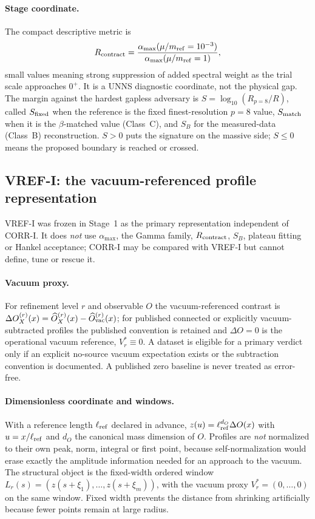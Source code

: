\documentclass[11pt,a4paper]{article}
\theoremstyle{definition}
\theoremstyle{remark}
\newcommand{\uns}{UNNS}
\begin{document}
\paragraph{Stage coordinate.} The compact descriptive metric is
\begin{equation}
R_{\rm contract}=\frac{\alpha_{\max}(\mu/m_{\rm ref}=10^{-3})}{\alpha_{\max}(\mu/m_{\rm ref}=1)},
\end{equation}
small values meaning strong suppression of added spectral weight as the trial scale approaches $0^+$. It is a \uns{} diagnostic coordinate, not the physical gap. The margin against the hardest gapless adversary is $S=\log_{10}(R_{p=8}/R)$, called $S_{\rm fixed}$ when the reference is the fixed finest-resolution $p=8$ value, $S_{\rm match}$ when it is the $\beta$-matched value (Class~C), and $S_B$ for the measured-data (Class~B) reconstruction. $S>0$ puts the signature on the massive side; $S\le0$ means the proposed boundary is reached or crossed.

\subsection{VREF-I: the vacuum-referenced profile representation}\label{ssec:vrefi}
VREF-I was frozen in Stage~1 as the primary representation independent of CORR-I. It does \emph{not} use $\alpha_{\max}$, the Gamma family, $R_{\rm contract}$, $S_B$, plateau fitting or Hankel acceptance; CORR-I may be compared with VREF-I but cannot define, tune or rescue it.

\paragraph{Vacuum proxy.} For refinement level $r$ and observable $O$ the vacuum-referenced contrast is $\Delta O_X^{(r)}(x)=\widehat O_X^{(r)}(x)-\widehat O_{\rm vac}^{(r)}(x)$; for published connected or explicitly vacuum-subtracted profiles the published convention is retained and $\Delta O=0$ is the operational vacuum reference, $V^*_r\equiv0$. A dataset is eligible for a primary verdict only if an explicit no-source vacuum expectation exists or the subtraction convention is documented. A published zero baseline is never treated as error-free.

\paragraph{Dimensionless coordinate and windows.} With a reference length $\ell_{\rm ref}$ declared in advance, $z(u)=\ell_{\rm ref}^{d_O}\Delta O(x)$ with $u=x/\ell_{\rm ref}$ and $d_O$ the canonical mass dimension of $O$. Profiles are \emph{not} normalized to their own peak, norm, integral or first point, because self-normalization would erase exactly the amplitude information needed for an approach to the vacuum. The structural object is the fixed-width ordered window $L_r(s)=(z(s+\xi_1),\dots,z(s+\xi_m))$, with the vacuum proxy $V^*_r=(0,\dots,0)$ on the same window. Fixed width prevents the distance from shrinking artificially because fewer points remain at large radius.
\end{document}
